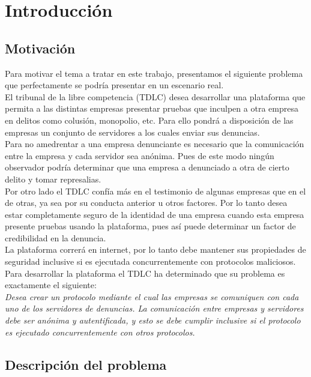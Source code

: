 \chapter{Introducción}

\section{Motivación}
Para motivar el tema a tratar en este trabajo, presentamos el siguiente problema que
perfectamente se podría presentar en un escenario real.\\
El tribunal de la libre competencia (TDLC) desea desarrollar una plataforma que permita
a las distintas empresas presentar pruebas que inculpen
a otra empresa en delitos como colusión, monopolio, etc. Para ello pondrá
a disposición de las empresas un conjunto de servidores a los cuales enviar sus denuncias.\\
Para no amedrentar a una empresa
denunciante  es necesario que la comunicación entre la empresa y cada servidor
sea anónima. Pues de este modo ningún observador podría determinar que una empresa a denunciado
a otra de cierto delito y tomar represalias.\\
Por otro lado el TDLC confía más en el testimonio de algunas empresas que en el de otras, ya sea por
su conducta anterior u otros factores. Por lo tanto desea estar completamente seguro de la identidad
de una empresa cuando esta empresa presente pruebas usando la plataforma, pues así puede determinar
un factor de credibilidad en la denuncia.\\
La plataforma correrá en internet, por lo tanto debe mantener sus propiedades de seguridad inclusive
si es ejecutada concurrentemente con protocolos maliciosos.\\
Para desarrollar la plataforma el TDLC ha determinado que su problema es exactamente el siguiente:\\
\textit{Desea crear un protocolo mediante el cual las empresas se comuniquen con cada uno de los servidores
de denuncias. La comunicación entre empresas y servidores debe ser anónima y autentificada, y esto se
debe cumplir inclusive si el protocolo es ejecutado concurrentemente con otros protocolos.}\\ 

\section{Descripción del problema}

